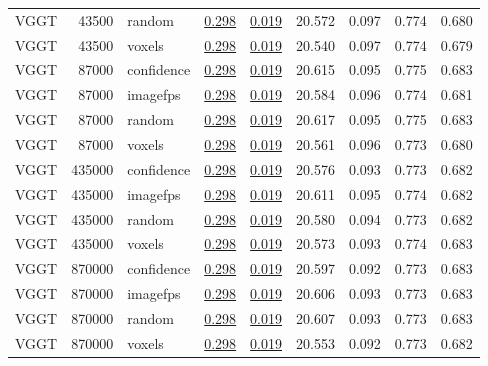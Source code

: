 \begin{table}[H]
\begin{tabular}{lrlrrrrrr}
VGGT & 43500 & random & \underline{0.298} & \underline{0.019} & 20.572 & 0.097 & 0.774 & 0.680 \\
VGGT & 43500 & voxels & \underline{0.298} & \underline{0.019} & 20.540 & 0.097 & 0.774 & 0.679 \\
VGGT & 87000 & confidence & \underline{0.298} & \underline{0.019} & 20.615 & 0.095 & 0.775 & 0.683 \\
VGGT & 87000 & imagefps & \underline{0.298} & \underline{0.019} & 20.584 & 0.096 & 0.774 & 0.681 \\
VGGT & 87000 & random & \underline{0.298} & \underline{0.019} & 20.617 & 0.095 & 0.775 & 0.683 \\
VGGT & 87000 & voxels & \underline{0.298} & \underline{0.019} & 20.561 & 0.096 & 0.773 & 0.680 \\
VGGT & 435000 & confidence & \underline{0.298} & \underline{0.019} & 20.576 & 0.093 & 0.773 & 0.682 \\
VGGT & 435000 & imagefps & \underline{0.298} & \underline{0.019} & 20.611 & 0.095 & 0.774 & 0.682 \\
VGGT & 435000 & random & \underline{0.298} & \underline{0.019} & 20.580 & 0.094 & 0.773 & 0.682 \\
VGGT & 435000 & voxels & \underline{0.298} & \underline{0.019} & 20.573 & 0.093 & 0.774 & 0.683 \\
VGGT & 870000 & confidence & \underline{0.298} & \underline{0.019} & 20.597 & 0.092 & 0.773 & 0.683 \\
VGGT & 870000 & imagefps & \underline{0.298} & \underline{0.019} & 20.606 & 0.093 & 0.773 & 0.683 \\
VGGT & 870000 & random & \underline{0.298} & \underline{0.019} & 20.607 & 0.093 & 0.773 & 0.683 \\
VGGT & 870000 & voxels & \underline{0.298} & \underline{0.019} & 20.553 & 0.092 & 0.773 & 0.682 \\
\bottomrule
\end{tabular}
\end{table}